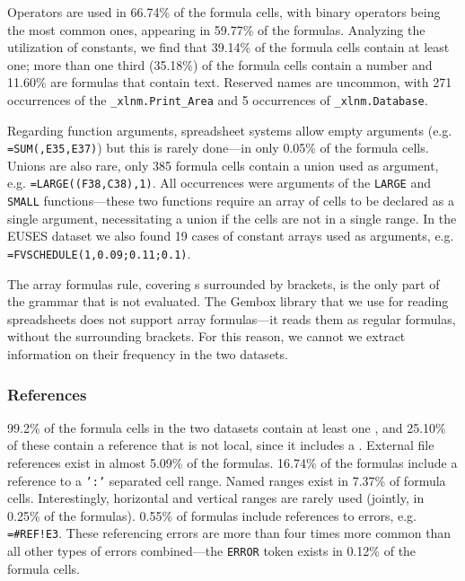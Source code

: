 \documentclass[conference]{IEEEtran}
\begin{document}
Operators are used in 66.74\% of the formula cells, with binary operators being the most common ones, appearing in 59.77\% of the formulas. Analyzing the utilization of constants, we find that 39.14\% of the formula cells contain at least one; more than one third (35.18\%) of the formula cells contain a number and 11.60\% are formulas that contain text. Reserved names are uncommon, with 271 occurrences of the \texttt{_xlnm.Print_Area} and 5 occurrences of \texttt{_xlnm.Database}.

Regarding function arguments, spreadsheet systems allow empty arguments (e.g. \texttt{=SUM(,E35,E37)}) but this is rarely done---in only 0.05\% of the formula cells. Unions are also rare, only 385 formula cells contain a union used as argument, e.g. \texttt{=LARGE((F38,C38),1)}. All occurrences were arguments of the \texttt{LARGE} and \texttt{SMALL} functions---these two functions require an array of cells to be declared as a single argument, necessitating a union if the cells are not in a single range. In the EUSES dataset we also found 19 cases of constant arrays used as arguments, e.g. \texttt{=FVSCHEDULE(1,{0.09;0.11;0.1})}.

The array formulas rule, covering s surrounded by brackets, is the only part of the grammar that is not evaluated. The Gembox library that we use for reading spreadsheets does not support array formulas---it reads them as regular formulas, without the surrounding brackets. For this reason, we cannot we extract information on their frequency in the two datasets.

\subsubsection{References}

99.2\% of the formula cells in the two datasets contain at least one , and 25.10\% of these contain a reference that is not local, since it includes a . External file references exist in almost 5.09\% of the formulas. 16.74\% of the formulas include a reference to a \texttt{':'} separated cell range. Named ranges exist in 7.37\% of formula cells. Interestingly, horizontal and vertical ranges are rarely used (jointly, in 0.25\% of the formulas). 0.55\% of formulas include references to errors, e.g. \texttt{=\#REF!E3}. These referencing errors are more than four times more common than all other types of errors combined---the \texttt{ERROR} token exists in 0.12\% of the formula cells.
\end{document}
